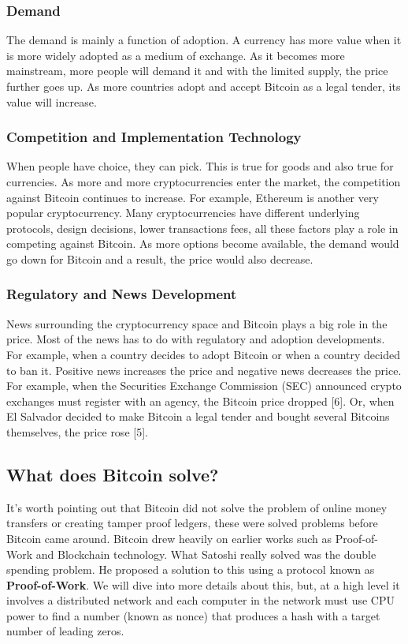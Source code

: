 \documentclass[11pt]{article} %
\begin{document}
\subsubsection{Demand}{}
The demand is mainly a function of adoption. A currency has more value when it is more widely adopted as a medium of exchange. As it becomes more mainstream, more people will demand it and with the limited supply, the price further goes up. As more countries adopt and accept Bitcoin as a legal tender, its value will increase.

\subsubsection{Competition and Implementation Technology}{}
When people have choice, they can pick. This is true for goods and also true for currencies. As more and more cryptocurrencies enter the market, the competition against Bitcoin continues to increase. For example, Ethereum is another very popular cryptocurrency. Many cryptocurrencies have different underlying protocols, design decisions, lower transactions fees, all these factors play a role in competing against Bitcoin. As more options become available, the demand would go down for Bitcoin and a result, the price would also decrease.

\subsubsection{Regulatory and News Development}{}
News surrounding the cryptocurrency space and Bitcoin plays a big role in the price. Most of the news has to do with regulatory and adoption developments. For example, when a country decides to adopt Bitcoin or when a country decided to ban it. Positive news increases the price and negative news decreases the price. For example, when the Securities Exchange Commission (SEC) announced crypto exchanges must register with an agency, the Bitcoin price dropped [6]. Or, when El Salvador decided to make Bitcoin a legal tender and bought several Bitcoins themselves, the price rose [5].

\subsection{What does Bitcoin solve?}{}
It's worth pointing out that Bitcoin did not solve the problem of online money transfers or creating tamper proof ledgers, these were solved problems before Bitcoin came around. Bitcoin drew heavily on earlier works such as Proof-of-Work and Blockchain technology. What Satoshi really solved was the double spending problem. He proposed a solution to this using a protocol known as \textbf{Proof-of-Work}. We will dive into more details about this, but, at a high level it involves a distributed network and each computer in the network must use CPU power to find a number (known as nonce) that produces a hash with a target number of leading zeros.
\end{document}
